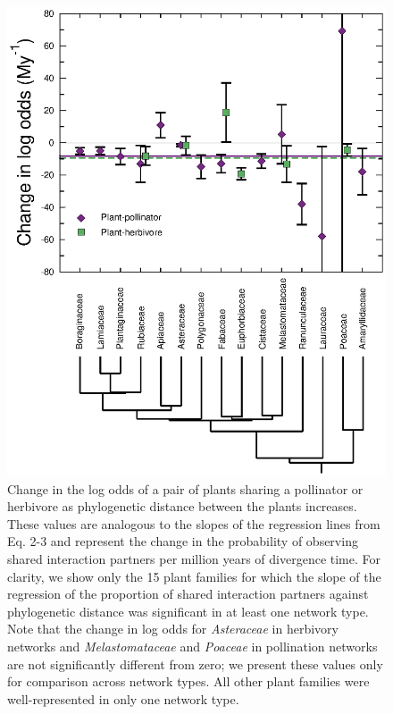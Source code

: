\documentclass[12pt]{article}
\begin{document}
  \begin{figure}[!h]
    \begin{center}
      \centerline{\includegraphics*[height=.62\textheight]{Figures/dataplots/Family/allfams_full.eps}}
    \end{center}
    \caption{Change in the log odds of a pair of plants sharing a pollinator or herbivore as phylogenetic distance between the plants increases. These values are analogous to the slopes of the regression lines from Eq. 2-3 and represent
    the change in the probability of observing shared 
    interaction partners per million years of divergence time. 
    For clarity, we show only the 15 plant families for which the slope of the regression of the proportion of shared interaction partners against phylogenetic distance was significant in at least one network type. 
    Note that the change in log odds for \emph{Asteraceae} in herbivory networks and \emph{Melastomataceae} and \emph{Poaceae} in pollination networks are not significantly different from zero; we present these values only for comparison across network types. All other plant families were well-represented in only one network type.
}
\end{figure}
\end{document}
